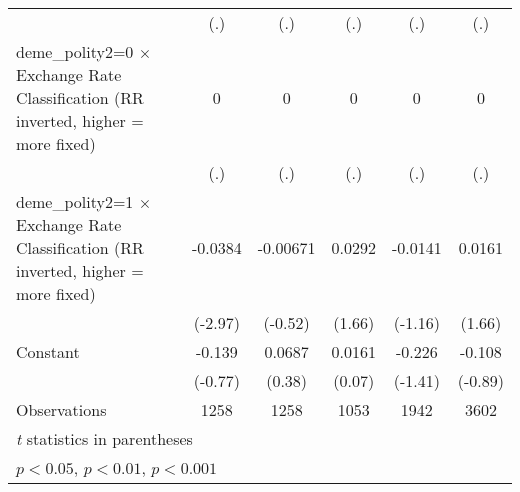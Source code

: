 {\begin{tabular*}{\linewidth}{@{\hskip\tabcolsep\extracolsep\fill}l*{5}{c}}
                &      (.)         &      (.)         &      (.)         &      (.)         &      (.)         \\
[1em]
deme\_polity2=0 $\times$ Exchange Rate Classification (RR inverted, higher = more fixed)&        0         &        0         &        0         &        0         &        0         \\
                &      (.)         &      (.)         &      (.)         &      (.)         &      (.)         \\
[1em]
deme\_polity2=1 $\times$ Exchange Rate Classification (RR inverted, higher = more fixed)&  -0.0384\sym{**} & -0.00671         &   0.0292         &  -0.0141         &   0.0161         \\
                &  (-2.97)         &  (-0.52)         &   (1.66)         &  (-1.16)         &   (1.66)         \\
[1em]
Constant        &   -0.139         &   0.0687         &   0.0161         &   -0.226         &   -0.108         \\
                &  (-0.77)         &   (0.38)         &   (0.07)         &  (-1.41)         &  (-0.89)         \\
\hline
Observations    &     1258         &     1258         &     1053         &     1942         &     3602         \\
\hline\hline
\multicolumn{6}{l}{\footnotesize \textit{t} statistics in parentheses}\\
\multicolumn{6}{l}{\footnotesize \sym{*} \(p<0.05\), \sym{**} \(p<0.01\), \sym{***} \(p<0.001\)}\\
\end{tabular*}
}
